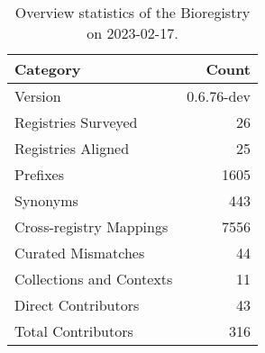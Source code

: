 \begin{table}
\centering
\caption{Overview statistics of the Bioregistry on 2023-02-17.}
\label{tab:bioregistry-summary}
\begin{tabular}{lr}
\toprule
                Category &      Count \\
\midrule
                 Version & 0.6.76-dev \\
     Registries Surveyed &         26 \\
      Registries Aligned &         25 \\
                Prefixes &       1605 \\
                Synonyms &        443 \\
 Cross-registry Mappings &       7556 \\
      Curated Mismatches &         44 \\
Collections and Contexts &         11 \\
     Direct Contributors &         43 \\
      Total Contributors &        316 \\
\bottomrule
\end{tabular}
\end{table}
